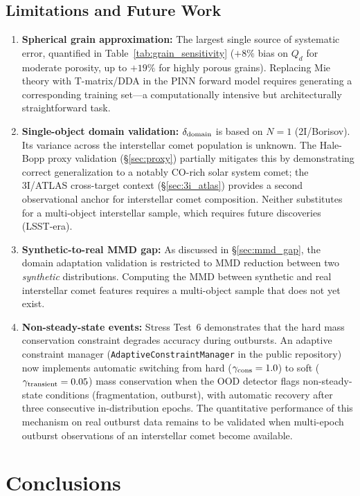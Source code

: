 \documentclass[usenatbib]{mnras}
\begin{document}
\subsection{Limitations and Future Work}

\begin{enumerate}
    \item \textbf{Spherical grain approximation:} The largest single source of systematic error, quantified in Table~\ref{tab:grain_sensitivity} ($+8\%$ bias on $Q_d$ for moderate porosity, up to $+19\%$ for highly porous grains). Replacing Mie theory with T-matrix/DDA in the PINN forward model requires generating a corresponding training set---a computationally intensive but architecturally straightforward task.
    \item \textbf{Single-object domain validation:} $\delta_{\rm domain}$ is based on $N=1$ (2I/Borisov). Its variance across the interstellar comet population is unknown. The Hale-Bopp proxy validation (\S\ref{sec:proxy}) partially mitigates this by demonstrating correct generalization to a notably CO-rich solar system comet; the 3I/ATLAS cross-target context (\S\ref{sec:3i_atlas}) provides a second observational anchor for interstellar comet composition. Neither substitutes for a multi-object interstellar sample, which requires future discoveries (LSST-era).
    \item \textbf{Synthetic-to-real MMD gap:} As discussed in \S\ref{sec:mmd_gap}, the domain adaptation validation is restricted to MMD reduction between two \textit{synthetic} distributions. Computing the MMD between synthetic and real interstellar comet features requires a multi-object sample that does not yet exist.
    \item \textbf{Non-steady-state events:} Stress Test~6 demonstrates that the hard mass conservation constraint degrades accuracy during outbursts. An adaptive constraint manager (\texttt{AdaptiveConstraintManager} in the public repository) now implements automatic switching from hard ($\gamma_{\rm cons}=1.0$) to soft ($\gamma_{\rm transient}=0.05$) mass conservation when the OOD detector flags non-steady-state conditions (fragmentation, outburst), with automatic recovery after three consecutive in-distribution epochs. The quantitative performance of this mechanism on real outburst data remains to be validated when multi-epoch outburst observations of an interstellar comet become available.
\end{enumerate}

\section{Conclusions}\label{sec:conclusions}
\end{document}
